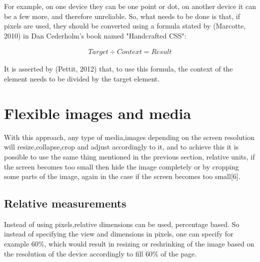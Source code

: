 For example, on one device they can be one point or dot, on another device it can be a few more, and therefore
unreliable. So, what needs to be done is that, if pixels are used, they should be converted using
a formula stated by (Marcotte, 2010) in  Dan Cederholm's book named "Handcrafted CSS":

\begin{ceqn}
\begin{align}
    Target \div Context = Result
\end{align}
\end{ceqn}

It is asserted by (Pettit, 2012) that, to use this formula, the context of the element
needs to be divided by the target element.



\section{Flexible images and media}

With this approach, any type of media,images depending on the screen resolution
will resize,collapse,crop and adjust accordingly to it, and to achieve this
it is possible to use the same thing mentioned in the previous section, relative units,
if the screen becomes too small then hide the image completely or by cropping some parts
of the image, again in the case if the screen becomes too small[6].

\subsection{Relative measurements} 

Instead of using pixels,relative dimensions can be used, percentage based. So instead of
specifying the view and dimensions in pixels, one can specify for example 60\%, which would result
in resizing or reshrinking of the image based on the resolution of the device accordingly to fill
60\% of the page. 

    
    
